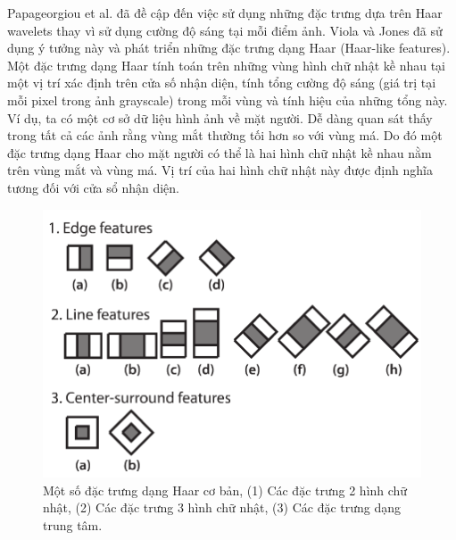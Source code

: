 \documentclass[14pt, oneside, a4paper, openany]{scrartcl}
\begin{document}
Papageorgiou et al. \cite{Papageorgiou} đã đề cập đến việc sử dụng những đặc trưng dựa trên Haar wavelets thay vì sử dụng cường độ sáng tại mỗi điểm ảnh. Viola và Jones đã sử dụng ý tưởng này và phát triển những đặc trưng dạng Haar (Haar-like features).
Một đặc trưng dạng Haar tính toán trên những vùng hình chữ nhật kề nhau tại một vị trí xác định trên cửa số nhận diện, tính tổng cường độ sáng (giá trị tại mỗi pixel trong ảnh grayscale) trong mỗi vùng và tính hiệu của những tổng này.
Ví dụ, ta có một cơ sở dữ liệu hình ảnh về mặt người. Dễ dàng quan sát thấy trong tất cả các ảnh rằng vùng mắt thường tối hơn so với vùng má. Do đó một đặc trưng dạng Haar cho mặt người có thể là hai hình chữ nhật kề nhau nằm trên vùng mắt và vùng má. Vị trí của hai hình chữ nhật này được định nghĩa tương đối với cửa sổ nhận diện.

\begin{figure}
	\centering
	\includegraphics[scale=0.8]{figures/HaarFeatures.png} 
	\caption[Một số đặc trưng dạng Haar cơ bản]{Một số đặc trưng dạng Haar cơ bản, (1) Các đặc trưng 2 hình chữ nhật, 
		(2) Các đặc trưng 3 hình chữ nhật,
		(3) Các đặc trưng dạng trung tâm.}
\end{figure}
\end{document}
